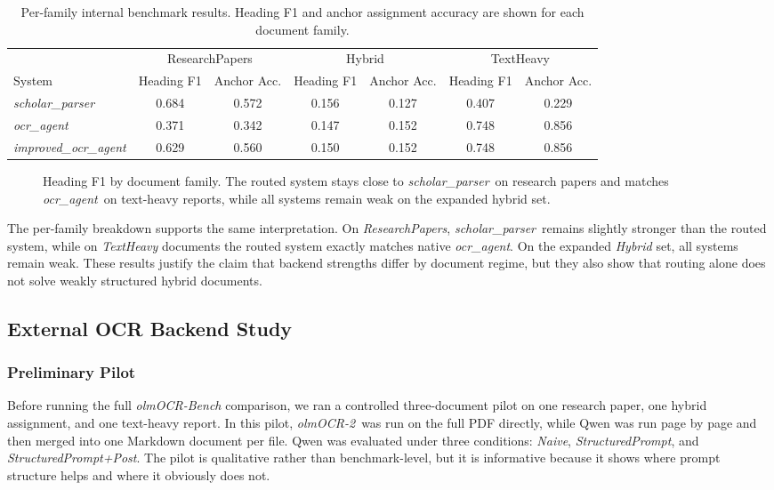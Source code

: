\documentclass[conference]{IEEEtran}
\newcommand{\papername}[1]{\textit{#1}}
\newcommand{\scholar}{\papername{scholar\_parser}}
\newcommand{\ocragent}{\papername{ocr\_agent}}
\newcommand{\improvedocr}{\papername{improved\_ocr\_agent}}
\newcommand{\olmocr}{\papername{olmOCR-2}}
\begin{document}
\begin{table}[t]
\caption{Per-family internal benchmark results. Heading F1 and anchor assignment accuracy are shown for each document family.}
\label{tab:internal-family}
\centering
\begin{tabular}{lcccccc}
\toprule
& \multicolumn{2}{c}{ResearchPapers} & \multicolumn{2}{c}{Hybrid} & \multicolumn{2}{c}{TextHeavy} \\
\cmidrule(lr){2-3}\cmidrule(lr){4-5}\cmidrule(lr){6-7}
System & Heading F1 & Anchor Acc. & Heading F1 & Anchor Acc. & Heading F1 & Anchor Acc. \\
\midrule
\scholar & 0.684 & 0.572 & 0.156 & 0.127 & 0.407 & 0.229 \\
\ocragent & 0.371 & 0.342 & 0.147 & 0.152 & 0.748 & 0.856 \\
\improvedocr & 0.629 & 0.560 & 0.150 & 0.152 & 0.748 & 0.856 \\
\bottomrule
\end{tabular}
\end{table}

\begin{figure}[t]
\centering

\caption{Heading F1 by document family. The routed system stays close to \scholar\ on research papers and matches \ocragent\ on text-heavy reports, while all systems remain weak on the expanded hybrid set.}
\label{fig:internal-family}
\end{figure}

The per-family breakdown supports the same interpretation. On \papername{ResearchPapers}, \scholar\ remains slightly stronger than the routed system, while on \papername{TextHeavy} documents the routed system exactly matches native \ocragent. On the expanded \papername{Hybrid} set, all systems remain weak. These results justify the claim that backend strengths differ by document regime, but they also show that routing alone does not solve weakly structured hybrid documents.

\subsection{External OCR Backend Study}

\subsubsection{Preliminary Pilot}

Before running the full \papername{olmOCR-Bench} comparison, we ran a controlled three-document pilot on one research paper, one hybrid assignment, and one text-heavy report. In this pilot, \olmocr\ was run on the full PDF directly, while Qwen was run page by page and then merged into one Markdown document per file. Qwen was evaluated under three conditions: \papername{Naive}, \papername{StructuredPrompt}, and \papername{StructuredPrompt+Post}. The pilot is qualitative rather than benchmark-level, but it is informative because it shows where prompt structure helps and where it obviously does not.
\end{document}
